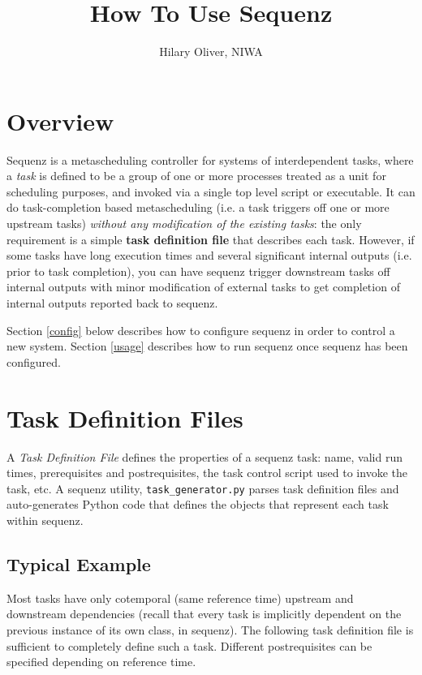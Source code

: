 \documentclass[11pt,a4paper]{article}
\title{How To Use Sequenz}
\author{Hilary Oliver, NIWA}
\begin{document}
\maketitle
\tableofcontents

\section{Overview}

Sequenz is a metascheduling controller for systems of interdependent
tasks, where a {\em task} is defined to be a group of one or more
processes treated as a unit for scheduling purposes, and invoked via a
single top level script or executable.  It can do task-completion based
metascheduling (i.e. a task triggers off  one or more
upstream tasks) {\em without any modification of the existing tasks}:
the only requirement is a simple \textbf{task definition file} that
describes each task. However, if some tasks have long execution times
and several significant internal outputs (i.e. prior to task
completion), you can have sequenz trigger downstream tasks off internal
outputs with minor modification of external tasks to get completion of
internal outputs reported back to sequenz. 

Section \ref{config} below describes how to configure sequenz in order to
control a new system.  Section \ref{usage} describes how to run sequenz
once sequenz has been configured.

\label{config}
\section{Task Definition Files}

A {\em Task Definition File} defines the properties of a sequenz task:
name, valid run times, prerequisites and postrequisites, the task
control script used to invoke the task, etc.  A sequenz utility,
\verb=task_generator.py= parses task definition files and auto-generates
Python code that defines the objects that represent each task within
sequenz.

\subsection{Typical Example}

Most tasks have only cotemporal (same reference time) upstream and
downstream dependencies (recall that every task is implicitly dependent
on the previous instance of its own class, in sequenz). The following
task definition file is sufficient to completely define such a task.
Different postrequisites can be specified depending on reference time. 
\end{document}
